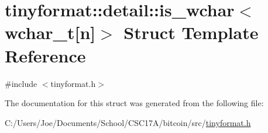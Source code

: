 \hypertarget{structtinyformat_1_1detail_1_1is__wchar_3_01wchar__t[n]_4}{}\section{tinyformat\+:\+:detail\+:\+:is\+\_\+wchar$<$ wchar\+\_\+t\mbox{[}n\mbox{]}$>$ Struct Template Reference}
\label{structtinyformat_1_1detail_1_1is__wchar_3_01wchar__t[n]_4}


{\ttfamily \#include $<$tinyformat.\+h$>$}



The documentation for this struct was generated from the following file\+:\begin{DoxyCompactItemize}
\item 
C\+:/\+Users/\+Joe/\+Documents/\+School/\+C\+S\+C17\+A/bitcoin/src/\hyperlink{tinyformat_8h}{tinyformat.\+h}\end{DoxyCompactItemize}
